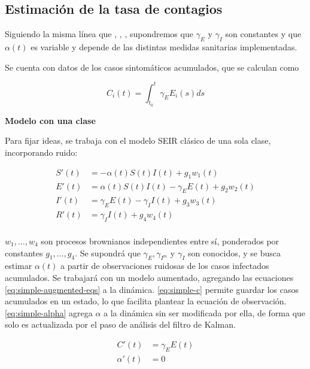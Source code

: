 \subsection{Estimación de la tasa de contagios}

Siguiendo la misma línea que \cite{Hasan2020}, \cite{Hasan2021}, \cite{Hasan2021a}, supondremos que \(\gamma_E\) y \(\gamma_I\) son constantes y que \(\alpha(t)\) es variable y depende de las distintas medidas sanitarias implementadas.


Se cuenta con datos de los casos sintomáticos acumulados, que se calculan como 

\[
C_i(t) = \int_{t_0}^t \gamma_E E_i(s) ds
\]

\noindent \textbf{Modelo con una clase}

Para fijar ideas, se trabaja con el modelo SEIR clásico de una sola clase, incorporando ruido:

\begin{equation}
\begin{aligned}
S'(t) &= -\alpha(t) S(t)I(t) + g_1 w_1(t)\\
E'(t) &= \alpha(t) S(t)I(t) - \gamma_E E(t) + g_2 w_2(t)\\
I'(t) &= \gamma_E E(t) - \gamma_{I} I(t) + g_3 w_3(t)\\
R'(t) &= \gamma_{I} I(t) + g_4 w_4(t)\\
\end{aligned}
\end{equation}

\(w_1, \dots, w_4\) son procesos brownianos independientes entre sí, ponderados por constantes \(g_1, \dots, g_4\).
Se supondrá que \(\gamma_E, \gamma_{I^m}\) y \(\gamma_I\) son conocidos, y se busca estimar \(\alpha(t)\) a partir de observaciones ruidosas de los casos infectados acumulados. Se trabajará con un modelo aumentado, agregando las ecuaciones \ref{eq:simple-augmented-eqs} a la dinámica. \ref{eq:simple-c} permite guardar los casos acumulados en un estado, lo que facilita plantear la ecuación de observación. \ref{eq:simple-alpha} agrega \(\alpha\) a la dinámica sin ser modificada por ella, de forma que solo es actualizada por el paso de análisis del filtro de Kalman.

\begin{subequations}\label{eq:simple-augmented-eqs}
\begin{align}
C'(t)       &= \gamma_E E(t) \label{eq:simple-c} \\ 
\alpha'(t)  &= 0    \label{eq:simple-alpha}
\end{align}
\end{subequations}

